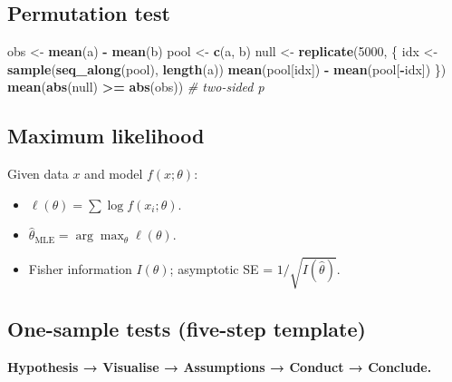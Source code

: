 \documentclass[
]{article}
\newenvironment{Shaded}{\begin{snugshade}}{\end{snugshade}}
\newcommand{\CommentTok}[1]{\textcolor[rgb]{0.56,0.35,0.01}{\textit{#1}}}
\newcommand{\DecValTok}[1]{\textcolor[rgb]{0.00,0.00,0.81}{#1}}
\newcommand{\FunctionTok}[1]{\textcolor[rgb]{0.13,0.29,0.53}{\textbf{#1}}}
\newcommand{\NormalTok}[1]{#1}
\newcommand{\OtherTok}[1]{\textcolor[rgb]{0.56,0.35,0.01}{#1}}
\newcommand{\SpecialCharTok}[1]{\textcolor[rgb]{0.81,0.36,0.00}{\textbf{#1}}}
\providecommand{\tightlist}{%
  \setlength{\itemsep}{0pt}\setlength{\parskip}{0pt}}
\begin{document}
\subsection{Permutation test}\label{permutation-test}

\begin{Shaded}
\begin{Highlighting}[]
\NormalTok{obs  }\OtherTok{\textless{}{-}} \FunctionTok{mean}\NormalTok{(a) }\SpecialCharTok{{-}} \FunctionTok{mean}\NormalTok{(b)}
\NormalTok{pool }\OtherTok{\textless{}{-}} \FunctionTok{c}\NormalTok{(a, b)}
\NormalTok{null }\OtherTok{\textless{}{-}} \FunctionTok{replicate}\NormalTok{(}\DecValTok{5000}\NormalTok{, \{}
\NormalTok{  idx }\OtherTok{\textless{}{-}} \FunctionTok{sample}\NormalTok{(}\FunctionTok{seq\_along}\NormalTok{(pool), }\FunctionTok{length}\NormalTok{(a))}
  \FunctionTok{mean}\NormalTok{(pool[idx]) }\SpecialCharTok{{-}} \FunctionTok{mean}\NormalTok{(pool[}\SpecialCharTok{{-}}\NormalTok{idx])}
\NormalTok{\})}
\FunctionTok{mean}\NormalTok{(}\FunctionTok{abs}\NormalTok{(null) }\SpecialCharTok{\textgreater{}=} \FunctionTok{abs}\NormalTok{(obs))   }\CommentTok{\# two{-}sided p}
\end{Highlighting}
\end{Shaded}

\subsection{Maximum likelihood}\label{maximum-likelihood}

Given data \(x\) and model \(f(x; \theta)\):

\begin{itemize}
\tightlist
\item
  \(\ell(\theta) = \sum \log f(x_i; \theta)\).
\item
  \(\hat\theta_{\text{MLE}} = \arg\max_\theta \ell(\theta)\).
\item
  Fisher information \(I(\theta)\); asymptotic SE =
  \(1/\sqrt{I(\hat\theta)}\).
\end{itemize}

\subsection{One-sample tests (five-step
template)}\label{one-sample-tests-five-step-template}

\textbf{Hypothesis → Visualise → Assumptions → Conduct → Conclude.}
\end{document}
